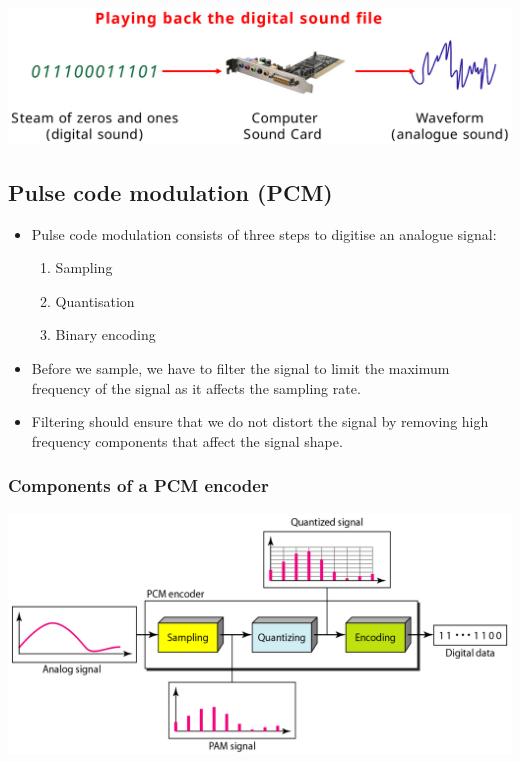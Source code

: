 \documentclass[11pt]{article}
\begin{document}
\begin{center}
\includegraphics[width=.9\linewidth]{./images/playing-back-the-digital-sound-file.png}
\end{center}
\subsection{Pulse code modulation (PCM)}
\label{sec:orgb2f41a3}
\begin{itemize}
\item Pulse code modulation consists of three steps to digitise an analogue signal:
\begin{enumerate}
\item Sampling
\item Quantisation
\item Binary encoding
\end{enumerate}
\item Before we sample, we have to filter the signal to limit the maximum frequency of the signal as it affects the sampling rate.
\item Filtering should ensure that we do not distort the signal by removing high frequency components that affect the signal shape.
\end{itemize}
\subsubsection{Components of a PCM encoder}
\label{sec:orga84b659}
\begin{center}
\includegraphics[width=.9\linewidth]{./images/components-of-a-pcm-encoder.png}
\end{center}
\end{document}

